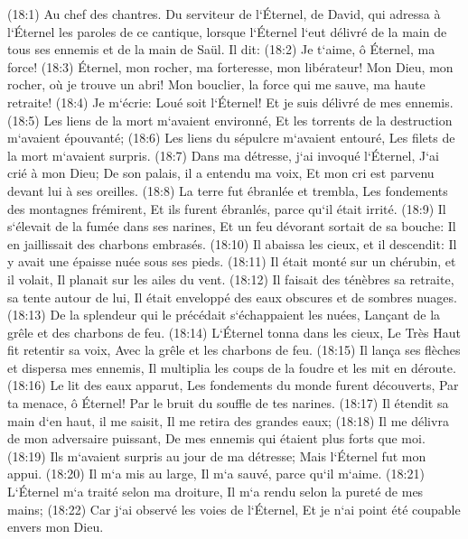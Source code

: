 \verse (18:1) Au chef des chantres. Du serviteur de l`Éternel, de David, qui adressa à l`Éternel les paroles de ce cantique, lorsque l`Éternel l`eut délivré de la main de tous ses ennemis et de la main de Saül. Il dit: (18:2) Je t`aime, ô Éternel, ma force! 
\verse (18:3) Éternel, mon rocher, ma forteresse, mon libérateur! Mon Dieu, mon rocher, où je trouve un abri! Mon bouclier, la force qui me sauve, ma haute retraite! 
\verse (18:4) Je m`écrie: Loué soit l`Éternel! Et je suis délivré de mes ennemis. 
\verse (18:5) Les liens de la mort m`avaient environné, Et les torrents de la destruction m`avaient épouvanté; 
\verse (18:6) Les liens du sépulcre m`avaient entouré, Les filets de la mort m`avaient surpris. 
\verse (18:7) Dans ma détresse, j`ai invoqué l`Éternel, J`ai crié à mon Dieu; De son palais, il a entendu ma voix, Et mon cri est parvenu devant lui à ses oreilles. 
\verse (18:8) La terre fut ébranlée et trembla, Les fondements des montagnes frémirent, Et ils furent ébranlés, parce qu`il était irrité. 
\verse (18:9) Il s`élevait de la fumée dans ses narines, Et un feu dévorant sortait de sa bouche: Il en jaillissait des charbons embrasés. 
\verse (18:10) Il abaissa les cieux, et il descendit: Il y avait une épaisse nuée sous ses pieds. 
\verse (18:11) Il était monté sur un chérubin, et il volait, Il planait sur les ailes du vent. 
\verse (18:12) Il faisait des ténèbres sa retraite, sa tente autour de lui, Il était enveloppé des eaux obscures et de sombres nuages. 
\verse (18:13) De la splendeur qui le précédait s`échappaient les nuées, Lançant de la grêle et des charbons de feu. 
\verse (18:14) L`Éternel tonna dans les cieux, Le Très Haut fit retentir sa voix, Avec la grêle et les charbons de feu. 
\verse (18:15) Il lança ses flèches et dispersa mes ennemis, Il multiplia les coups de la foudre et les mit en déroute. 
\verse (18:16) Le lit des eaux apparut, Les fondements du monde furent découverts, Par ta menace, ô Éternel! Par le bruit du souffle de tes narines. 
\verse (18:17) Il étendit sa main d`en haut, il me saisit, Il me retira des grandes eaux; 
\verse (18:18) Il me délivra de mon adversaire puissant, De mes ennemis qui étaient plus forts que moi. 
\verse (18:19) Ils m`avaient surpris au jour de ma détresse; Mais l`Éternel fut mon appui. 
\verse (18:20) Il m`a mis au large, Il m`a sauvé, parce qu`il m`aime. 
\verse (18:21) L`Éternel m`a traité selon ma droiture, Il m`a rendu selon la pureté de mes mains; 
\verse (18:22) Car j`ai observé les voies de l`Éternel, Et je n`ai point été coupable envers mon Dieu. 
